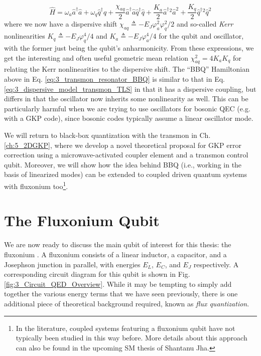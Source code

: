 \begin{equation}
    \hat{H} = \omega_a \hat{a}^\dagger\hat{a} + \omega_q \hat{q}^\dagger\hat{q} + \frac{\chi_{aq}}{2}\hat{a}^\dagger\hat{a}\hat{q}^\dagger\hat{q}  + \frac{K_a}{2}\hat{a}^\dagger{}^2\hat{a}^2 + \frac{K_q}{2}\hat{q}^\dagger{}^2\hat{q}^2
    \label{eq:3_transmon_resonator_BBQ}
\end{equation}
where we now have a dispersive shift $\chi_{aq} \triangleq -E_J\varphi_a^2 \varphi_q^2/2$ and so-called \textit{Kerr} nonlinearities $K_q \triangleq -E_J\varphi_q^4/4$ and $K_a \triangleq -E_J\varphi_a^4/4$ for the qubit and oscillator, with the former just being the qubit's anharmonicity. From these expressions, we get the interesting and often useful geometric mean relation $\chi_{aq}^2 = 4K_aK_q$ for relating the Kerr nonlinearities to the dispersive shift. The ``BBQ'' Hamiltonian above in Eq. \eqref{eq:3_transmon_resonator_BBQ} is similar to that in Eq. \eqref{eq:3_dispersive_model_transmon_TLS} in that it has a dispersive coupling, but differs in that the oscillator now inherits some nonlinearity as well. This can be particularly harmful when we are trying to use oscillators for bosonic QEC (e.g. with a GKP code), since bosonic codes typically assume a linear oscillator mode. 

We will return to black-box quantization with the transmon in Ch. \ref{ch:5_2DGKP}, where we develop a novel theoretical proposal for GKP error correction using a microwave-activated coupler element and a transmon control qubit. Moreover, we will show how the idea behind BBQ (i.e., working in the basis of linearized modes) can be extended to coupled driven quantum systems with fluxonium too\footnote{In the literature, coupled systems featuring a fluxonium qubit have not typically been studied in this way before. More details about this approach can also be found in the upcoming SM thesis of Shantanu Jha.}. 


\clearpage
\section{The Fluxonium Qubit}

We are now ready to discuss the main qubit of interest for this thesis: the fluxonium \cite{manucharyan2009fluxonium}. A fluxonium consists of a linear inductor, a capacitor, and a Josephson junction in parallel, with energies $E_L$, $E_C$, and $E_J$ respectively. A corresponding circuit diagram for this qubit is shown in Fig. \eqref{fig:3_Circuit_QED_Overview}. While it may be tempting to simply add together the various energy terms that we have seen previously, there is one additional piece of theoretical background required, known as \textit{flux quantization}. 

